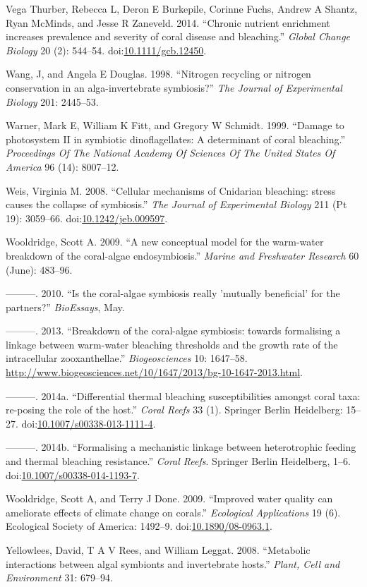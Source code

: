 \documentclass[]{elsarticle} %
\begin{document}
\hypertarget{ref-VegaThurber:2014hk}{}
Vega Thurber, Rebecca L, Deron E Burkepile, Corinne Fuchs, Andrew A
Shantz, Ryan McMinds, and Jesse R Zaneveld. 2014. ``Chronic nutrient
enrichment increases prevalence and severity of coral disease and
bleaching.'' \emph{Global Change Biology} 20 (2): 544--54.
doi:\href{https://doi.org/10.1111/gcb.12450}{10.1111/gcb.12450}.

\hypertarget{ref-Wang:1998p128}{}
Wang, J, and Angela E Douglas. 1998. ``Nitrogen recycling or nitrogen
conservation in an alga-invertebrate symbiosis?'' \emph{The Journal of
Experimental Biology} 201: 2445--53.

\hypertarget{ref-Warner:1999p4239}{}
Warner, Mark E, William K Fitt, and Gregory W Schmidt. 1999. ``Damage to
photosystem II in symbiotic dinoflagellates: A determinant of coral
bleaching.'' \emph{Proceedings Of The National Academy Of Sciences Of
The United States Of America} 96 (14): 8007--12.

\hypertarget{ref-Weis:2008p944}{}
Weis, Virginia M. 2008. ``Cellular mechanisms of Cnidarian bleaching:
stress causes the collapse of symbiosis.'' \emph{The Journal of
Experimental Biology} 211 (Pt 19): 3059--66.
doi:\href{https://doi.org/10.1242/jeb.009597}{10.1242/jeb.009597}.

\hypertarget{ref-Wooldridge:2009p7807}{}
Wooldridge, Scott A. 2009. ``A new conceptual model for the warm-water
breakdown of the coral-algae endosymbiosis.'' \emph{Marine and
Freshwater Research} 60 (June): 483--96.

\hypertarget{ref-Wooldridge:2010p7809}{}
---------. 2010. ``Is the coral-algae symbiosis really 'mutually
beneficial' for the partners?'' \emph{BioEssays}, May.

\hypertarget{ref-Wooldridge:2013tj}{}
---------. 2013. ``Breakdown of the coral-algae symbiosis: towards
formalising a linkage between warm-water bleaching thresholds and the
growth rate of the intracellular zooxanthellae.'' \emph{Biogeosciences}
10: 1647--58.
\url{http://www.biogeosciences.net/10/1647/2013/bg-10-1647-2013.html}.

\hypertarget{ref-Wooldridge:2014di}{}
---------. 2014a. ``Differential thermal bleaching susceptibilities
amongst coral taxa: re-posing the role of the host.'' \emph{Coral Reefs}
33 (1). Springer Berlin Heidelberg: 15--27.
doi:\href{https://doi.org/10.1007/s00338-013-1111-4}{10.1007/s00338-013-1111-4}.

\hypertarget{ref-Wooldridge:2014hc}{}
---------. 2014b. ``Formalising a mechanistic linkage between
heterotrophic feeding and thermal bleaching resistance.'' \emph{Coral
Reefs}. Springer Berlin Heidelberg, 1--6.
doi:\href{https://doi.org/10.1007/s00338-014-1193-7}{10.1007/s00338-014-1193-7}.

\hypertarget{ref-Wooldridge:2009kb}{}
Wooldridge, Scott A, and Terry J Done. 2009. ``Improved water quality
can ameliorate effects of climate change on corals.'' \emph{Ecological
Applications} 19 (6). Ecological Society of America: 1492--9.
doi:\href{https://doi.org/10.1890/08-0963.1}{10.1890/08-0963.1}.

\hypertarget{ref-Yellowlees:2008p331}{}
Yellowlees, David, T A V Rees, and William Leggat. 2008. ``Metabolic
interactions between algal symbionts and invertebrate hosts.''
\emph{Plant, Cell and Environment} 31: 679--94.
\end{document}
